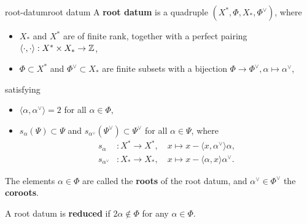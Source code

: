 \begin{topic}{root-datum}{root datum}
    A \textbf{root datum} is a quadruple $(X^*, \Phi, X_*, \Phi^\vee)$, where
    \begin{itemize}
        \item $X_*$ and $X^*$ are  of finite rank, together with a perfect pairing $\langle \cdot, \cdot \rangle : X^* \times X_* \to \mathbb{Z}$,
        \item $\Phi \subset X^*$ and $\Phi^\vee \subset X_*$ are finite subsets with a bijection $\Phi \to \Phi^\vee, \alpha \mapsto \alpha^\vee$,
    \end{itemize}
    satisfying
    \begin{itemize}
        \item $\langle \alpha, \alpha^\vee \rangle = 2$ for all $\alpha \in \Phi$,
        \item $s_\alpha(\Psi) \subset \Psi$ and $s_{\alpha^\vee}(\Psi^\vee) \subset \Psi^\vee$ for all $\alpha \in \Psi$, where
        \[ \begin{aligned}
            s_\alpha &: X^* \to X^*, \quad x \mapsto x - \langle x, \alpha^\vee \rangle \alpha , \\
            s_{\alpha^\vee} &: X_* \to X_*, \quad x \mapsto x - \langle \alpha, x \rangle \alpha^\vee.
        \end{aligned} \]
    \end{itemize}
    The elements $\alpha \in \Phi$ are called the \textbf{roots} of the root datum, and $\alpha^\vee \in \Phi^\vee$ the \textbf{coroots}.
    
    A root datum is \textbf{reduced} if $2 \alpha \not\in \Phi$ for any $\alpha \in \Phi$.
\end{topic}

